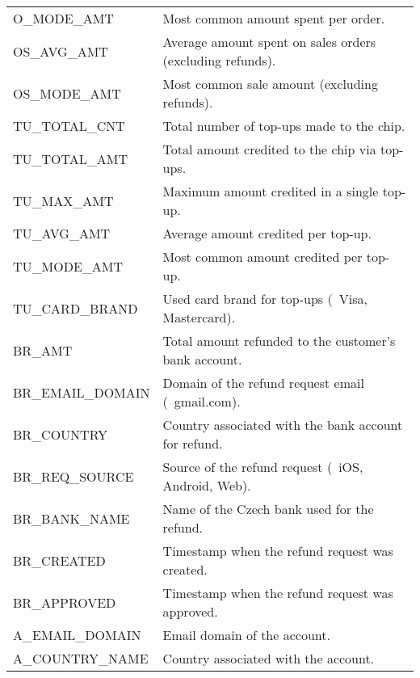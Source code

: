 \begin{table}[H]
\begin{tabularx}{\textwidth}{|>{\columncolor{unicorn_blue!5}}X|>{\columncolor{unicorn_blue!5}}l|}
		O\_MODE\_AMT                         & Most common amount spent per order.                          \\
		OS\_AVG\_AMT                         & Average amount spent on sales orders (excluding refunds).    \\
		OS\_MODE\_AMT                        & Most common sale amount (excluding refunds).                 \\
		TU\_TOTAL\_CNT                       & Total number of top-ups made to the chip.                    \\
		TU\_TOTAL\_AMT                       & Total amount credited to the chip via top-ups.               \\
		TU\_MAX\_AMT                         & Maximum amount credited in a single top-up.                  \\
		TU\_AVG\_AMT                         & Average amount credited per top-up.                          \\
		TU\_MODE\_AMT                        & Most common amount credited per top-up.                      \\
		TU\_CARD\_BRAND                      & Used card brand for top-ups (\eg~Visa, Mastercard).          \\
		\hline
		BR\_AMT                              & Total amount refunded to the customer's bank account.        \\
		BR\_EMAIL\_DOMAIN                    & Domain of the refund request email (\eg~gmail.com).          \\
		BR\_COUNTRY                          & Country associated with the bank account for refund.         \\
		BR\_REQ\_SOURCE                      & Source of the refund request (\eg~iOS, Android, Web).        \\
		BR\_BANK\_NAME                       & Name of the Czech bank used for the refund.                  \\
		BR\_CREATED                          & Timestamp when the refund request was created.               \\
		BR\_APPROVED                         & Timestamp when the refund request was approved.              \\
		\hline
		A\_EMAIL\_DOMAIN                     & Email domain of the account.                                 \\
		A\_COUNTRY\_NAME                     & Country associated with the account.                         \\

\end{tabularx}
\end{table}
